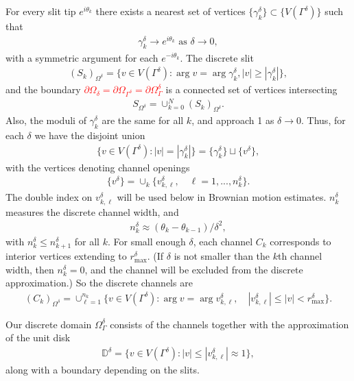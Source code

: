 \documentclass[]{amsart}
\numberwithin{equation}{section}
\newcommand{\D}{\mathbb{D}}
\begin{document}
For every slit tip
$e^{ i \theta_k}$
there exists a nearest set of vertices $\{\gamma_k^{\delta}\} \subset \{V( \varGamma^{\delta}) \}$ such that 
\begin{align}
\gamma_k^{\delta} \to e^{i \theta_k} \text{ as } \delta \to 0,
\end{align}
with a symmetric argument for each $e^{ - i \theta_k}$.
The discrete slit
\begin{align}
(S_k)_{\Omega^{\delta}} = \{ v \in V(\varGamma^{\delta}) : \arg v = \arg \gamma_k^{\delta}, |v| \ge |\gamma_k^{\delta}|\},
\end{align}
and the boundary \textcolor{red}{$\partial \Omega_{\delta} = \partial \Omega_{\varGamma^{\delta}} = \partial \Omega_{\varGamma}^{\delta}$} is a connected set of vertices intersecting
\begin{align}
S_{\Omega^{\delta}} = \cup_{k=0}^N (S_k)_{\Omega^{\delta}}.
\end{align}
Also, the moduli of $\gamma_k^{\delta}$ are the same for all $k$, and approach 1 as $\delta \to 0$.  
Thus, for each $\delta$ we have the disjoint union
\begin{align}
\{v \in V(\varGamma^{\delta}) : |v| = |\gamma_k^{\delta}| \} = \{\gamma_k^{\delta}\} \sqcup \{v^{\delta} \},
\end{align}
with the vertices denoting channel openings
\begin{align}
 \{v^{\delta} \} = \cup_k \{v^{\delta}_{k,\ell}, \quad \ell = 1, ..., n_k^{\delta} \}.
\end{align}
The double index on  $v^{\delta}_{k,\ell}$ will be used below in Brownian motion estimates.  $n_k^{\delta}$ measures the discrete channel width, and 
\begin{align}
n_k^{\delta} \approx (\theta_k - \theta_{k-1})/\delta^2,
\end{align}
with $n_k^{\delta} \leq n_{k+1}^{\delta}$ for all $k$.
For small enough $\delta$, each channel $C_k$ corresponds to interior vertices extending to $r_{\text{max}}^{\delta}$.
(If $\delta$ is not smaller than the $k$th channel width, then $n_k^{\delta} = 0$, and the channel will be excluded from the discrete approximation.)  So the discrete channels are
\begin{align}
(C_k)_{\Omega^{\delta}} = \cup_{\ell = 1}^{n_k} \{ v \in V(\varGamma^{\delta}) : \arg v = \arg v_{k,\ell}^{\delta}, \quad |v_{k,\ell}^{\delta}| \leq |v| < r^{\delta}_{\text{max}}\}.
\end{align}

Our discrete domain $\varOmega_{\varGamma}^{\delta}$ consists of the channels together with the approximation of the unit disk
\begin{align}
\D^{\delta} = \{ v \in V(\varGamma^{\delta}) : |v| \leq |v_{k,\ell}^{\delta}| \approx 1\},
\end{align}
along with a boundary depending on the slits.
\end{document}
